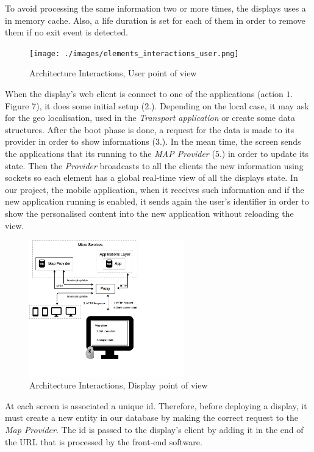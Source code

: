 \documentclass[]{usiinfbachelorproject}
\begin{document}
To avoid processing the same information two or more times, the displays uses a in memory cache. Also, a life duration is set for each of them in order to remove them if no exit event is detected.
\begin{figure}[H]
  \centering
  \texttt{[image: ./images/elements\_interactions\_user.png]}
  \caption{Architecture Interactions, User point of view}

\end{figure} 
When the display's web client is connect to one of the applications (action $1.$ Figure 7), it does some initial setup ($2.$). Depending on the local case, it may ask for the geo localisation, used in the \emph{Transport application} or create some data structures. After the boot phase is done, a request for the data is made to its provider in order to show informations ($3.$).
In the mean time, the screen sends the applications that its running to the \emph{MAP Provider} ($5.$) in order to update its state. Then the \emph{Provider} broadcasts to all the clients the new information using sockets so each element has a global real-time view of all the displays state. In our project, the mobile application, when it receives such information and if the new application running is enabled, it sends again the user's identifier in order to show the personalised content into the new application without reloading the view.
\begin{figure}[H]
  \centering
  \includegraphics[width=0.6\textwidth]{./images/elements_interactions_display.png}
  \caption{Architecture Interactions, Display point of view}
\end{figure} 
At each screen is associated a unique id. Therefore, before deploying a display, it must create a new entity in our database by making the correct request to the \emph{Map Provider}. The id is passed to the display's client by adding it in the end of the URL that is processed by the front-end software.
\end{document}
